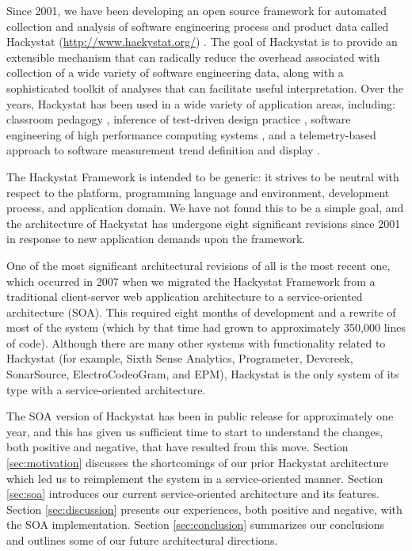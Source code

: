 \documentclass[conference,compsoc,peerreview]{IEEEtran}
\begin{document}
Since 2001, we have been developing an open source framework for automated
collection and analysis of software engineering process and product data
called Hackystat (\url{http://www.hackystat.org/})
\cite{csdl2-06-06,csdl2-02-07}.  The goal of Hackystat is to provide an
extensible mechanism that can radically reduce the overhead associated with
collection of a wide variety of software engineering data, along with a
sophisticated toolkit of analyses that can facilitate useful
interpretation.  Over the years, Hackystat has been used in a wide variety
of application areas, including: classroom pedagogy \cite{csdl2-03-12},
inference of test-driven design practice \cite{csdl2-06-13}, software
engineering of high performance computing systems \cite{csdl2-06-08}, and a
telemetry-based approach to software measurement trend definition and
display \cite{csdl2-04-11}.

The Hackystat Framework is intended to be generic: it strives to be neutral
with respect to the platform, programming language and environment,
development process, and application domain.  We have not found this to be
a simple goal, and the architecture of Hackystat has undergone eight
significant revisions since 2001 in response to new application demands
upon the framework.

One of the most significant architectural revisions of all is the most
recent one, which occurred in 2007 when we migrated the Hackystat Framework
from a traditional client-server web application architecture to a
service-oriented architecture (SOA).  This required eight months of
development and a rewrite of most of the system (which by that time had
grown to approximately 350,000 lines of code).  Although there are many
other systems with functionality related to Hackystat (for example, Sixth
Sense Analytics, Programeter, Devcreek, SonarSource, ElectroCodeoGram, and
EPM), Hackystat is the only system of its type with a service-oriented
architecture.

The SOA version of Hackystat has been in public release for approximately
one year, and this has given us sufficient time to start to understand the
changes, both positive and negative, that have resulted from this move.
Section \ref{sec:motivation} discusses the shortcomings of our prior
Hackystat architecture which led us to reimplement the system in a
service-oriented manner.  Section \ref{sec:soa} introduces our current
service-oriented architecture and its features.  Section
\ref{sec:discussion} presents our experiences, both positive and negative,
with the SOA implementation.  Section \ref{sec:conclusion} summarizes our
conclusions and outlines some of our future architectural directions.
\end{document}
